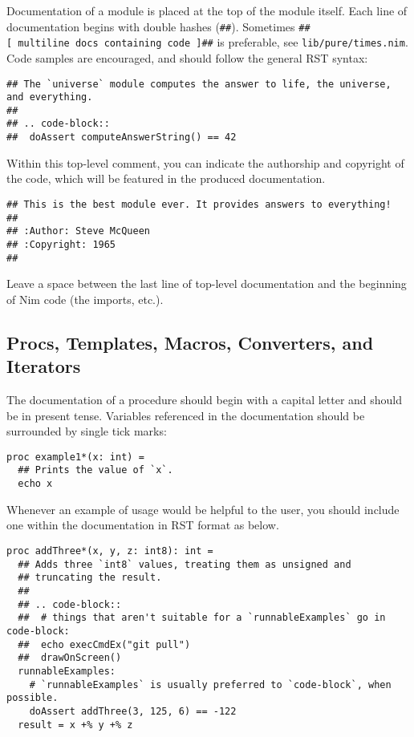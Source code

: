 Documentation of a module is placed at the top of the module itself.
Each line of documentation begins with double hashes (\texttt{\#\#}).
Sometimes \texttt{\#\#{[}\ multiline\ docs\ containing\ code\ {]}\#\#}
is preferable, see \texttt{lib/pure/times.nim}. Code samples are
encouraged, and should follow the general RST syntax:

\begin{verbatim}
## The `universe` module computes the answer to life, the universe, and everything.
##
## .. code-block::
##  doAssert computeAnswerString() == 42
\end{verbatim}

Within this top-level comment, you can indicate the authorship and
copyright of the code, which will be featured in the produced
documentation.

\begin{verbatim}
## This is the best module ever. It provides answers to everything!
##
## :Author: Steve McQueen
## :Copyright: 1965
##
\end{verbatim}

Leave a space between the last line of top-level documentation and the
beginning of Nim code (the imports, etc.).

\hypertarget{procs-templates-macros-converters-and-iterators}{%
\subsection{Procs, Templates, Macros, Converters, and
Iterators}\label{procs-templates-macros-converters-and-iterators}}

The documentation of a procedure should begin with a capital letter and
should be in present tense. Variables referenced in the documentation
should be surrounded by single tick marks:

\begin{verbatim}
proc example1*(x: int) =
  ## Prints the value of `x`.
  echo x
\end{verbatim}

Whenever an example of usage would be helpful to the user, you should
include one within the documentation in RST format as below.

\begin{verbatim}
proc addThree*(x, y, z: int8): int =
  ## Adds three `int8` values, treating them as unsigned and
  ## truncating the result.
  ##
  ## .. code-block::
  ##  # things that aren't suitable for a `runnableExamples` go in code-block:
  ##  echo execCmdEx("git pull")
  ##  drawOnScreen()
  runnableExamples:
    # `runnableExamples` is usually preferred to `code-block`, when possible.
    doAssert addThree(3, 125, 6) == -122
  result = x +% y +% z
\end{verbatim}

